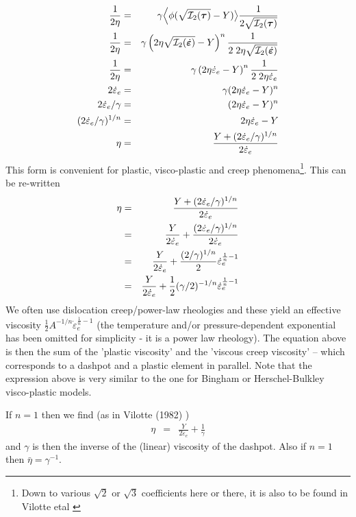 \begin{eqnarray}
\frac{1}{2\eta} 
&=& \gamma \Big\langle \phi(\sqrt{{\cal I}_2(\bm \tau)}- Y)  \big\rangle 
\frac{1}{2 \sqrt{{\cal I}_2(\bm \tau)}} \nonumber\\
\frac{1}{2\eta} 
&=& \gamma \left(2\eta \sqrt{{\cal I}_2(\dot{\bm\varepsilon})}- Y\right)^n  \frac{1}{2 \; 2 \eta \sqrt{{\cal I}_2(\dot{\bm\varepsilon})}} \nonumber\\
\frac{1}{2\eta} 
&=& \gamma \left(2\eta \dot\varepsilon_e - Y\right)^n  \frac{1}{2 \; 2 \eta \dot\varepsilon_e } \nonumber\\
2 \dot\varepsilon_e
&=& \gamma (2\eta \dot\varepsilon_e - Y)^n  \nonumber\\
2 \dot\varepsilon_e / \gamma
&=&  (2\eta \dot\varepsilon_e - Y)^n  \nonumber\\
(2 \dot\varepsilon_e / \gamma)^{1/n}
&=&  2\eta \dot\varepsilon_e - Y \nonumber\\
\eta &=& \frac{ Y + (2 \dot\varepsilon_e / \gamma)^{1/n}}{2  \dot\varepsilon_e}
\end{eqnarray}
This form is convenient for plastic, visco-plastic and creep phenomena\footnote{Down 
to various $\sqrt{2}$ or $\sqrt{3}$ coefficients here or there, it 
is also to be found in Vilotte etal \cite{vidm82,vidm84,vimd86}}.
This can be re-written
\begin{eqnarray}
\eta 
&=& \frac{ Y + (2 \dot\varepsilon_e / \gamma)^{1/n}}{2  \dot\varepsilon_e} \nonumber\\
&=& \frac{ Y }{2  \dot\varepsilon_e}
+ \frac{ (2 \dot\varepsilon_e / \gamma)^{1/n}}{2  \dot\varepsilon_e} \nonumber\\
&=& \frac{ Y }{2  \dot\varepsilon_e}
+ \frac{ (2  / \gamma)^{1/n}}{2 }   \dot\varepsilon_e^{\frac1n-1} \nonumber\\
&=& \frac{ Y }{2  \dot\varepsilon_e}
+ \frac{1 }{2 } (\gamma/2)^{-1/n}  \dot\varepsilon_e^{\frac1n-1} 
\label{eq:zien75:a}
\end{eqnarray}
We often use dislocation creep/power-law rheologies and these yield an effective 
viscosity $\frac12 A^{-1/n} \dot\varepsilon_e^{\frac1n-1}$ (the temperature and/or 
pressure-dependent exponential has been omitted for simplicity - it is a power law rheology).
The equation above is then the sum of the 'plastic viscosity' and the 'viscous creep viscosity' 
-- which corresponds to a dashpot and a plastic element in parallel.
Note that the expression above is very similar to the one for Bingham or Herschel-Bulkley visco-plastic
models.

If $n=1$ then we find (as in Vilotte \etal (1982) \cite{vidm82})
\begin{eqnarray}
\eta 
&=& \frac{ Y }{2  \dot\varepsilon_e}
+ \frac{1 }{\gamma } 
\end{eqnarray}
and $\gamma$ is then the inverse of the (linear) viscosity of the dashpot.
Also if $n=1$ then $\bar\eta=\gamma^{-1}$.

